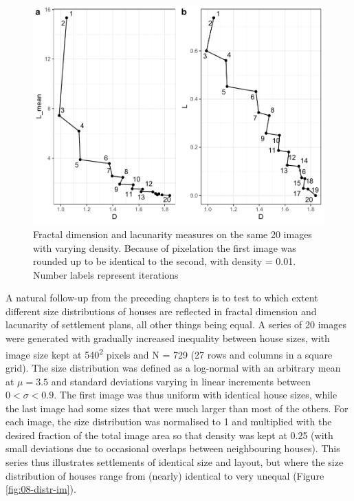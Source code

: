 \documentclass[
  12pt,
  a4paper, twoside]{book}
\begin{document}
\begin{figure}

{\centering \includegraphics[width=0.9\linewidth]{bookdown-demo_files/figure-latex/08-dens-1} 

}

\caption[D and L estimates, variable pixel density]{Fractal dimension and lacunarity measures on the same 20 images with varying density. Because of pixelation the first image was rounded up to be identical to the second, with density = 0.01. Number labels represent iterations}\label{fig:08-dens}
\end{figure}

A natural follow-up from the preceding chapters is to test to which extent different size distributions of houses are reflected in fractal dimension and lacunarity of settlement plans, all other things being equal. A series of 20 images were generated with gradually increased inequality between house sizes, with image size kept at 540\textsuperscript{2} pixels and N = 729 (27 rows and columns in a square grid). The size distribution was defined as a log-normal with an arbitrary mean at \(\mu = 3.5\) and standard deviations varying in linear increments between \(0 < \sigma < 0.9\). The first image was thus uniform with identical house sizes, while the last image had some sizes that were much larger than most of the others. For each image, the size distribution was normalised to 1 and multiplied with the desired fraction of the total image area so that density was kept at 0.25 (with small deviations due to occasional overlaps between neighbouring houses). This series thus illustrates settlements of identical size and layout, but where the size distribution of houses range from (nearly) identical to very unequal (Figure \ref{fig:08-distr-im}).
\end{document}
